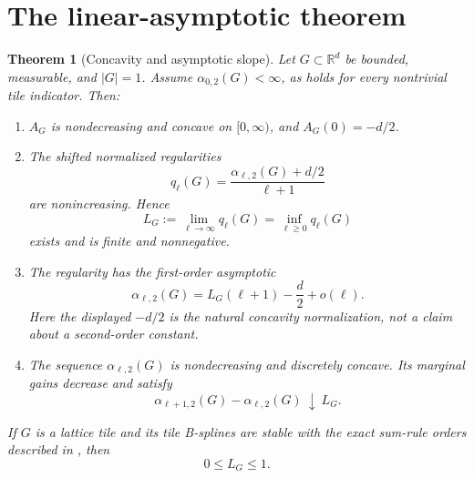 \documentclass[11pt]{article}
\newtheorem{theorem}{Theorem}
\theoremstyle{remark}
\newcommand{\R}{\mathbb R}
\begin{document}
\section{The linear-asymptotic theorem}

\begin{theorem}[Concavity and asymptotic slope]\label{thm:main}
Let $G\subset\R^d$ be bounded, measurable, and $|G|=1$.  Assume
$\alpha_{0,2}(G)<\infty$, as holds for every nontrivial tile indicator.  Then:
\begin{enumerate}[label=\textup{(\roman*)}]
\item $A_G$ is nondecreasing and concave on $[0,\infty)$, and
      $A_G(0)=-d/2$.
\item The shifted normalized regularities
\begin{equation}\label{eq:qmono}
 q_\ell(G)=\frac{\alpha_{\ell,2}(G)+d/2}{\ell+1}
\end{equation}
are nonincreasing.  Hence
\begin{equation}\label{eq:Ldef}
 L_G:=\lim_{\ell\to\infty}q_\ell(G)
     =\inf_{\ell\ge0}q_\ell(G)
\end{equation}
exists and is finite and nonnegative.
\item The regularity has the first-order asymptotic
\begin{equation}\label{eq:asymptotic}
 \alpha_{\ell,2}(G)=L_G(\ell+1)-\frac d2+o(\ell).
\end{equation}
Here the displayed $-d/2$ is the natural concavity normalization, not a claim
about a second-order constant.
\item The sequence $\alpha_{\ell,2}(G)$ is nondecreasing and discretely
concave.  Its marginal gains decrease and satisfy
\begin{equation}\label{eq:increments}
 \alpha_{\ell+1,2}(G)-\alpha_{\ell,2}(G)\ \downarrow\ L_G.
\end{equation}
\end{enumerate}
If $G$ is a lattice tile and its tile B-splines are stable with the exact
sum-rule orders described in \cite{Zaitseva2023,ProtasovZaitseva2025}, then
\begin{equation}\label{eq:tileupper}
 0\le L_G\le1.
\end{equation}
\end{theorem}
\end{document}
